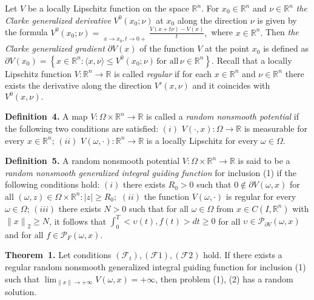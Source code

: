 Let $V$ be a locally Lipschitz function on the space $\mathbb{R}^{n}.$ For $x_{0} \in \mathbb{R}^{n}$ and $\nu \in \mathbb{R}^{n}$ {\it the Clarke generalized derivative} $V^{0}(x_{0} ;\nu )$ at $x_{0} $ along the direction $\nu $ is given by the formula
$
V^{0}(x_{0} ;\nu ) = \mathop{\overline {\lim}}\limits_{{x \to x_{0},}{t \to 0+}}\frac{{V(x + t\nu ) - V(x)}}{{t}},
$
where $x \in \mathbb{R}^{n}.$ Then {\it the Clarke genera\-li\-zed gradient} $\partial V(x)$ of the function $V$ at the point $x_{0}$ is defined as
$
\partial V(x_{0} ) = \left\{ {x \in \mathbb{R}^{n}: \langle {x,\nu } \rangle \le V^{0}(x_{0} ;\nu )\,\mbox{for all}\,\nu \in \mathbb{R}^{n}} \right\}.
$
Recall that a locally Lipschitz function $V:\mathbb{R}^n\to \mathbb{R}$ is called {\it regular} if for each $x\in \mathbb{R}^{n}$ and $\nu \in \mathbb{R}^{n}$ there exists the derivative along the direction $V'(x,\nu)$ and it coincides with $V^0(x,\nu).$

\textbf{Definition~4.}
A map $V\colon\Omega\times\mathbb{R}^{n}\to\mathbb{R}$ is called a {\it random nonsmooth potential} if the following two conditions are satisfied:
$(i)$ $V(\cdot,x)\colon\Omega\to\mathbb{R}$ is measurable for every $x\in\mathbb{R}^{n}$; \linebreak
$(ii)$ $V(\omega,\cdot)\colon\mathbb{R}^{n}\to\mathbb{R}$ is a locally Lipschitz for every $\omega\in\Omega$.

\textbf{Definition~5.}
            A random nonsmooth potential $V\colon\Omega\times\mathbb{R}^{n}\to\mathbb{R}$ is said to be a {\it random nonsmooth generalized integral guiding function} for inclusion (1) if the following conditions hold:
            $(i)$ there exists $R_0>0$ such that
$
	0\notin\partial V(\omega,x)
$
for all $(\omega,z)\in\Omega\times\mathbb{R}^{n}\colon |z|\geq R_0;$
						$(ii)$ the function $V(\omega,\cdot)$ is regular for every $\omega\in\Omega$;
$(iii)$ there exists $N>0$ such that for all $\omega\in\Omega$ from $x\in C(I,\mathbb{R}^{n})$ with
						${\|x\|}_{2}\geq N$, it follows that
            $
                \int_{0}^{T} \bigl<\upsilon(t),f(t)\bigr> dt \geq 0
            $
            for all $\upsilon\in\mathcal{P}_{\partial V}(\omega,x)$ and for all
						$f\in \mathcal{P}_{F}(\omega,x)$.

\textbf{Theorem~1.}
                Let conditions $(\mathcal{F}_t), (\mathcal{F}1), (\mathcal{F}2)$ hold. If there exists a regular random nonsmooth generalized integral guiding function for inclusion
                (1) such that $\lim_{\|x\|\to +\infty} V(\omega,x) = +\infty$, then problem (1), (2) has a random solution.

